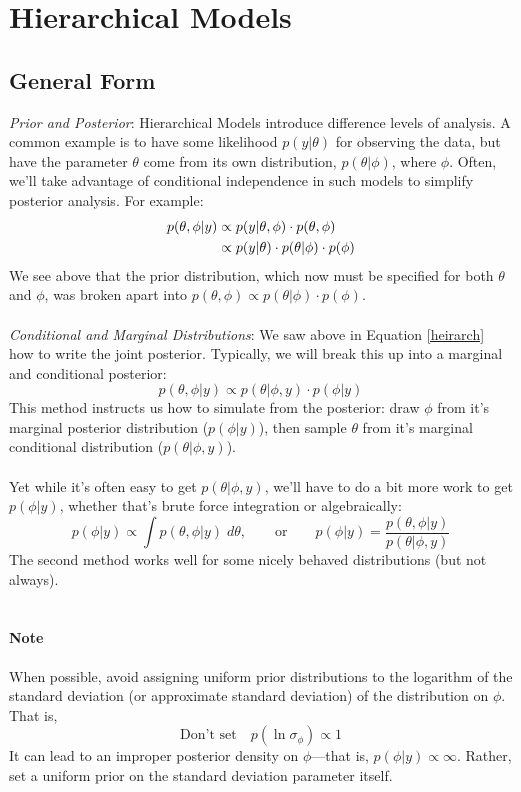 \documentclass[a4paper,12pt]{scrartcl}
\begin{document}
\newpage 
\section{Hierarchical Models}

\subsection{General Form}
{\sl Prior and Posterior}: 
Hierarchical Models introduce difference
levels of analysis.  A common example is to have some likelihood
$p(y|\theta)$ for observing the data, but have the parameter $\theta$
come from its own distribution, $p(\theta |\phi)$, where $\phi$.  
Often, we'll take advantage of 
conditional independence in such models to simplify 
posterior analysis. For example:
\begin{align}
   \label{heirarch}
   p(\theta,\phi|y) &\propto p(y| \theta, \phi)\cdot p(\theta, \phi) 
      \notag\\
   &\propto p(y|\theta) \cdot p(\theta|\phi)\cdot p(\phi)
\end{align}
We see above that the prior distribution, which now must be specified
for both $\theta$ and $\phi$, was broken apart into
$p(\theta, \phi) \propto p(\theta|\phi) \cdot p(\phi)$.
\\
\\
{\sl Conditional and Marginal Distributions}: We saw above
in Equation \ref{heirarch} how to write the joint posterior.
Typically, we will break this up into a marginal and conditional
posterior:
\[ p(\theta, \phi|y) \propto p(\theta | \phi, y)\cdot p(\phi | y) \]
This method instructs us how to simulate from the posterior: 
draw $\phi$ from it's marginal posterior distribution ($p(\phi|y)$), 
then sample $\theta$ from it's marginal conditional distribution
($p(\theta | \phi, y)$).
\\
\\
Yet while it's often easy to get $p(\theta | \phi, y)$, we'll have to 
do a bit more work to get $p(\phi |y)$, whether that's brute force
integration or algebraically:
\[ p(\phi|y) \propto \int p(\theta, \phi | y) \; d\theta, \qquad
   \text{or} \qquad p(\phi | y) = \frac{p(\theta, \phi | y)}{
   p(\theta | \phi, y)}\]
The second method works well for some nicely behaved distributions (but
not always).
\\
\\
\paragraph{Note} When possible, avoid assigning uniform prior
distributions
to the logarithm of the standard deviation (or approximate standard
deviation) of the distribution on
$\phi$. That is, 
\[ \text{Don't set} \quad p(\ln \sigma_\phi) \propto 1 \]
It can lead to an improper posterior density on $\phi$---that is,  
$p(\phi | y) \propto \infty$. Rather, set a uniform prior on the
standard deviation parameter itself.
\end{document}
